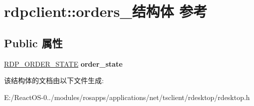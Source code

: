 \hypertarget{structrdpclient_1_1orders__}{}\section{rdpclient\+:\+:orders\+\_\+结构体 参考}
\label{structrdpclient_1_1orders__}
\subsection*{Public 属性}
\begin{DoxyCompactItemize}
\item 
\mbox{\label{structrdpclient_1_1orders___af3b5c28b4d1d1ec8147ce51cd2630020}} 
\hyperlink{struct___r_d_p___o_r_d_e_r___s_t_a_t_e}{R\+D\+P\+\_\+\+O\+R\+D\+E\+R\+\_\+\+S\+T\+A\+TE} {\bfseries order\+\_\+state}
\end{DoxyCompactItemize}


该结构体的文档由以下文件生成\+:\begin{DoxyCompactItemize}
\item 
E\+:/\+React\+O\+S-\/0../modules/rosapps/applications/net/tsclient/rdesktop/rdesktop.\+h\end{DoxyCompactItemize}
